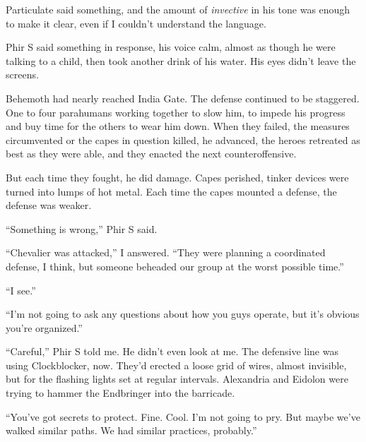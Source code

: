 





Particulate said something, and the amount of \emph{invective} in his tone was enough to make it clear, even if I couldn't understand the language.



Phir S\emph{ }said something in response, his voice calm, almost as though he were talking to a child, then took another drink of his water.  His eyes didn't leave the screens.



Behemoth had nearly reached India Gate.  The defense continued to be staggered.  One to four parahumans working together to slow him, to impede his progress and buy time for the others to wear him down.  When they failed, the measures circumvented or the capes in question killed, he advanced, the heroes retreated as best as they were able, and they enacted the next counteroffensive.



But each time they fought, he did damage.  Capes perished, tinker devices were turned into lumps of hot metal.  Each time the capes mounted a defense, the defense was weaker.



``Something is wrong,'' Phir S said.



``Chevalier was attacked,'' I answered.  ``They were planning a coordinated defense, I think, but someone beheaded our group at the worst possible time.''



``I see.''



``I'm not going to ask any questions about how you guys operate, but it's obvious you're organized.''



``Careful,'' Phir S told me.  He didn't even look at me.  The defensive line was using Clockblocker, now.  They'd erected a loose grid of wires, almost invisible, but for the flashing lights set at regular intervals.  Alexandria and Eidolon were trying to hammer the Endbringer into the barricade.



``You've got secrets to protect.  Fine.  Cool.  I'm not going to pry.  But maybe we've walked similar paths.  We had similar practices, probably.''



